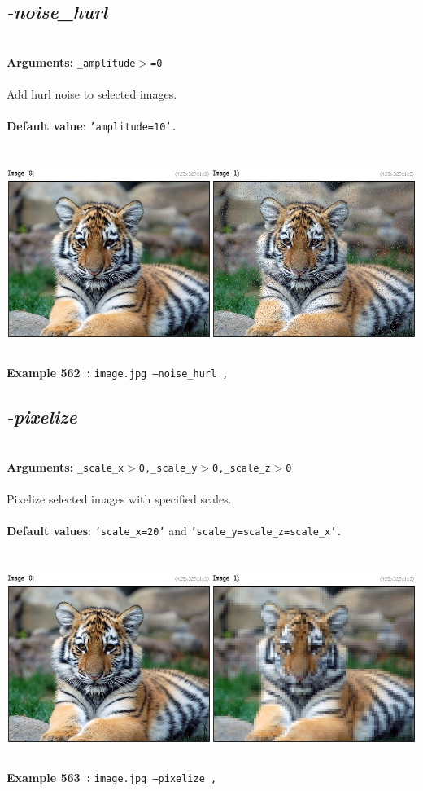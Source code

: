 \documentclass[a4paper,11pt,twoside]{book}
\begin{document}
\subsection{\emph{-noise\_hurl} }\vspace*{-0.5em}
~\\\textbf{Arguments: } 
{\small \texttt{\_amplitude$>$=0}}\\~\\
Add hurl noise to selected images.
~\\~\\\textbf{Default value}: {\small \texttt{'amplitude=10'.}}
\begin{center}\includegraphics[keepaspectratio=true,height=7cm,width=\textwidth]{img/gmic_def562.jpg}\\
{\footnotesize \textbf{Example 562~:} \texttt{image.jpg --noise\_hurl ,}}
\end{center}

\subsection{\emph{-pixelize} }\vspace*{-0.5em}
~\\\textbf{Arguments: } 
{\small \texttt{\_scale\_x$>$0,\_scale\_y$>$0,\_scale\_z$>$0}}\\~\\
Pixelize selected images with specified scales.
~\\~\\\textbf{Default values}: {\small \texttt{'scale\_x=20'} and \texttt{'scale\_y=scale\_z=scale\_x'.}}
\begin{center}\includegraphics[keepaspectratio=true,height=7cm,width=\textwidth]{img/gmic_def563.jpg}\\
{\footnotesize \textbf{Example 563~:} \texttt{image.jpg --pixelize ,}}
\end{center}
\end{document}
